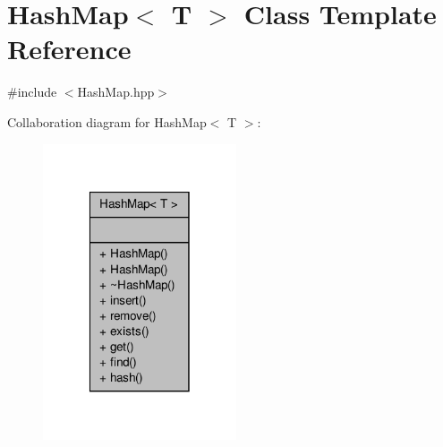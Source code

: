 \hypertarget{class_hash_map}{\section{Hash\-Map$<$ T $>$ Class Template Reference}
\label{class_hash_map}
}


{\ttfamily \#include $<$Hash\-Map.\-hpp$>$}



Collaboration diagram for Hash\-Map$<$ T $>$\-:
\nopagebreak
\begin{figure}[H]
\begin{center}
\leavevmode
\includegraphics[width=162pt]{class_hash_map__coll__graph}
\end{center}
\end{figure}
